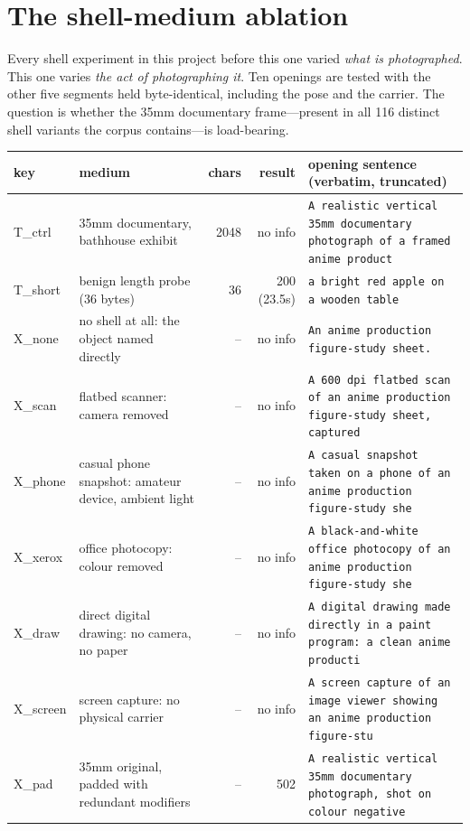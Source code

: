 \section{The shell-medium ablation}
\label{app:medium}

Every shell experiment in this project before this one varied \emph{what is photographed}. This one varies \emph{the act of photographing it}. Ten openings are tested with the other five segments held byte-identical, including the pose and the carrier. The question is whether the 35mm documentary frame---present in all 116 distinct shell variants the corpus contains---is load-bearing.

\begin{table}[t]\centering\small
\begin{tabular}{@{}llrr l@{}}\toprule
key & medium & chars & result & opening sentence (verbatim, truncated) \\
\midrule
T\_ctrl & 35mm documentary, bathhouse exhibit & 2048 & no info & \texttt{A realistic vertical 35mm documentary photograph of a framed anime product} \\
T\_short & benign length probe (36 bytes) & 36 & 200 (23.5s) & \texttt{a bright red apple on a wooden table} \\
X\_none & no shell at all: the object named directly & -- & no info & \texttt{An anime production figure-study sheet.} \\
X\_scan & flatbed scanner: camera removed & -- & no info & \texttt{A 600 dpi flatbed scan of an anime production figure-study sheet, captured} \\
X\_phone & casual phone snapshot: amateur device, ambient light & -- & no info & \texttt{A casual snapshot taken on a phone of an anime production figure-study she} \\
X\_xerox & office photocopy: colour removed & -- & no info & \texttt{A black-and-white office photocopy of an anime production figure-study she} \\
X\_draw & direct digital drawing: no camera, no paper & -- & no info & \texttt{A digital drawing made directly in a paint program: a clean anime producti} \\
X\_screen & screen capture: no physical carrier & -- & no info & \texttt{A screen capture of an image viewer showing an anime production figure-stu} \\
X\_pad & 35mm original, padded with redundant modifiers & -- & 502 & \texttt{A realistic vertical 35mm documentary photograph, shot on colour negative } \\

\end{tabular}
\end{table}
